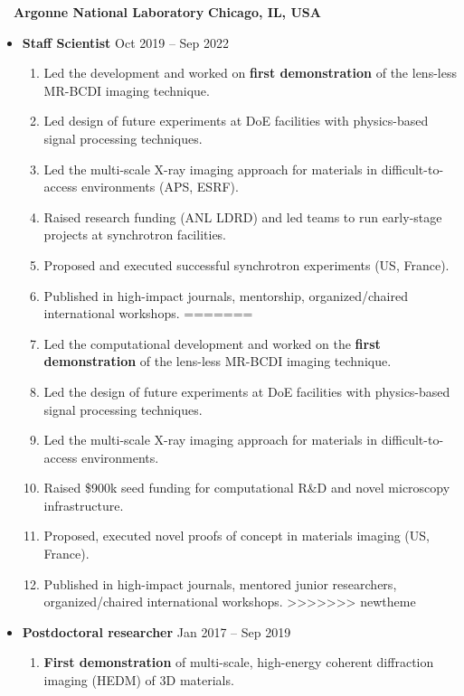 \documentclass[10.5pt]{article}
\begin{document}
~~{\color{black}\textbf{Argonne National Laboratory} \hfill  \textbf{Chicago, IL, USA}}\par
\begin{itemize}
    \item
        \textbf{Staff Scientist}
        \hfill  {Oct 2019 -- Sep 2022} \par
        \begin{enumerate}
<<<<<<< HEAD
            \item Led the development and worked on \textbf{first demonstration} of the lens-less MR-BCDI imaging technique.
            \item Led design of future experiments at DoE facilities with physics-based signal processing techniques.
            \item Led the multi-scale X-ray imaging approach for materials in difficult-to-access environments (APS, ESRF).
            \item Raised research funding (ANL LDRD) and led teams to run early-stage projects at synchrotron facilities.
            \item Proposed and executed successful synchrotron experiments (US, France).
            \item Published in high-impact journals, mentorship, organized/chaired international workshops.
=======
            \item Led the computational development and worked on the \textbf{first demonstration} of the lens-less MR-BCDI imaging technique.
            \item Led the design of future experiments at DoE facilities with physics-based signal processing techniques.
            \item Led the multi-scale X-ray imaging approach for materials in difficult-to-access environments.
            \item Raised \$900k seed funding for computational R\&D and novel microscopy infrastructure. 
            \item Proposed, executed novel proofs of concept in materials imaging (US, France).
            \item Published in high-impact journals, mentored junior researchers, organized/chaired international workshops.
>>>>>>> newtheme
        \end{enumerate}
    \item
        \textbf{Postdoctoral researcher}
        \hfill  {Jan 2017 -- Sep 2019} \par
        \begin{enumerate}
            \item \textbf{First demonstration} of multi-scale, high-energy coherent diffraction imaging (HEDM) of 3D materials.
        \end{enumerate}
\end{itemize} 
\end{document}

